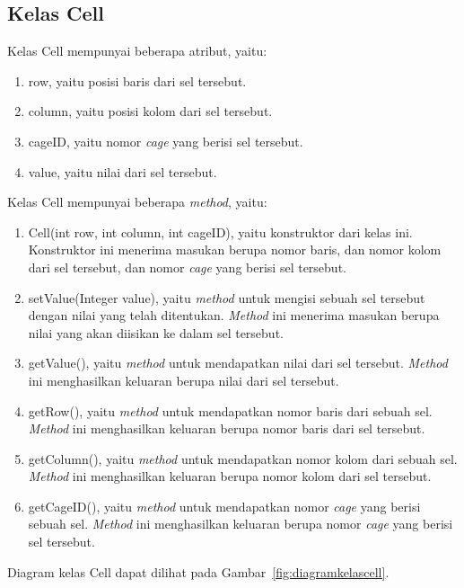 \subsection{Kelas Cell}
\label{sec:kelascell}

Kelas Cell mempunyai beberapa atribut, yaitu:

\begin{enumerate}
\item row, yaitu posisi baris dari sel tersebut.
\item column, yaitu posisi kolom dari sel tersebut.
\item cageID, yaitu nomor \textit{cage} yang berisi sel tersebut.
\item value, yaitu nilai dari sel tersebut.
\end{enumerate}

Kelas Cell mempunyai beberapa \textit{method}, yaitu:

\begin{enumerate}
\item Cell(int row, int column, int cageID), yaitu konstruktor dari kelas ini. Konstruktor ini menerima masukan berupa nomor baris, dan nomor kolom dari sel tersebut, dan nomor \textit{cage} yang berisi sel tersebut.
\item setValue(Integer value), yaitu \textit{method} untuk mengisi sebuah sel tersebut dengan nilai yang telah ditentukan. \textit{Method} ini menerima masukan berupa nilai yang akan diisikan ke dalam sel tersebut.
\item getValue(), yaitu \textit{method} untuk mendapatkan nilai dari sel tersebut. \textit{Method} ini menghasilkan keluaran berupa nilai dari sel tersebut.
\item getRow(), yaitu \textit{method} untuk mendapatkan nomor baris dari sebuah sel. \textit{Method} ini menghasilkan keluaran berupa nomor baris dari sel tersebut.
\item getColumn(), yaitu \textit{method} untuk mendapatkan nomor kolom dari sebuah sel. \textit{Method} ini menghasilkan keluaran berupa nomor kolom dari sel tersebut.
\item getCageID(), yaitu \textit{method} untuk mendapatkan nomor \textit{cage} yang berisi sebuah sel. \textit{Method} ini menghasilkan keluaran berupa nomor \textit{cage} yang berisi sel tersebut.
\end{enumerate}

Diagram kelas Cell dapat dilihat pada Gambar~\ref{fig:diagramkelascell}.

